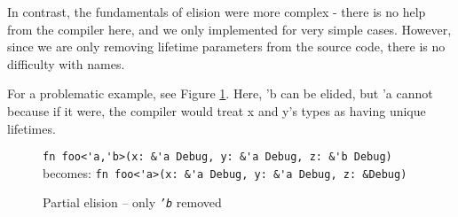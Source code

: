 In contrast, the fundamentals of elision were more complex - there is no help from the compiler here, and we only implemented for very simple cases. However, since we are only removing lifetime parameters from the source code, there is no difficulty with names.

For a problematic example, see Figure \ref{Fig:partial}. Here, 'b can be elided, but 'a cannot because if it were, the compiler would treat x and y's types as having unique lifetimes.

\begin{figure}[h]
{\verb|fn foo<'a,'b>(x: &'a Debug, y: &'a Debug, z: &'b Debug)|}\newline
becomes:\newline
{\verb|fn foo<'a>(x: &'a Debug, y: &'a Debug, z: &Debug)|}
\caption{Partial elision -- only \emph{\texttt{'b}} removed}
\label{Fig:partial}
\end{figure}